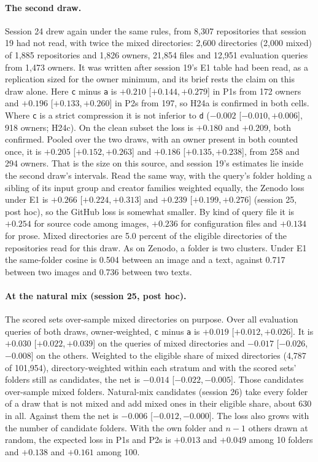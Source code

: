\documentclass[11pt]{article}
\newcommand{\rep}[1]{\texttt{#1}}
\newcommand{\ci}[2]{[\ensuremath{#1},\,\ensuremath{#2}]}  %
\begin{document}
\paragraph{The second draw.} Session 24 drew again under the same rules, from 8,307 repositories that session 19 had not read, with twice the mixed directories: 2,600 directories (2,000 mixed) of 1,885 repositories and 1,826 owners, 21,854 files and 12,951 evaluation queries from 1,473 owners. It was written after session 19's E1 table had been read, as a replication sized for the owner minimum, and its brief rests the claim on this draw alone. Here \rep{c} minus \rep{a} is $+0.210$ \ci{+0.144}{+0.279} in P1s from 172 owners and $+0.196$ \ci{+0.133}{+0.260} in P2s from 197, so H24a is confirmed in both cells. Where \rep{c} is a strict compression it is not inferior to \rep{d} ($-0.002$ \ci{-0.010}{+0.006}, 918 owners; H24c). On the clean subset the loss is $+0.180$ and $+0.209$, both confirmed. Pooled over the two draws, with an owner present in both counted once, it is $+0.205$ \ci{+0.152}{+0.263} and $+0.186$ \ci{+0.135}{+0.238}, from 258 and 294 owners. That is the size on this source, and session 19's estimates lie inside the second draw's intervals. Read the same way, with the query's folder holding a sibling of its input group and creator families weighted equally, the Zenodo loss under E1 is $+0.266$ \ci{+0.224}{+0.313} and $+0.239$ \ci{+0.199}{+0.276} (session 25, post hoc), so the GitHub loss is somewhat smaller. By kind of query file it is $+0.254$ for source code among images, $+0.236$ for configuration files and $+0.134$ for prose. Mixed directories are 5.0 percent of the eligible directories of the repositories read for this draw. As on Zenodo, a folder is two clusters. Under E1 the same-folder cosine is 0.504 between an image and a text, against 0.717 between two images and 0.736 between two texts.

\paragraph{At the natural mix (session 25, post hoc).} The scored sets over-sample mixed directories on purpose. Over all evaluation queries of both draws, owner-weighted, \rep{c} minus \rep{a} is $+0.019$ \ci{+0.012}{+0.026}. It is $+0.030$ \ci{+0.022}{+0.039} on the queries of mixed directories and $-0.017$ \ci{-0.026}{-0.008} on the others. Weighted to the eligible share of mixed directories (4,787 of 101,954), directory-weighted within each stratum and with the scored sets' folders still as candidates, the net is $-0.014$ \ci{-0.022}{-0.005}. Those candidates over-sample mixed folders. Natural-mix candidates (session 26) take every folder of a draw that is not mixed and add mixed ones in their eligible share, about 630 in all. Against them the net is $-0.006$ \ci{-0.012}{-0.000}. The loss also grows with the number of candidate folders. With the own folder and $n - 1$ others drawn at random, the expected loss in P1s and P2s is $+0.013$ and $+0.049$ among 10 folders and $+0.138$ and $+0.161$ among 100.
\end{document}
